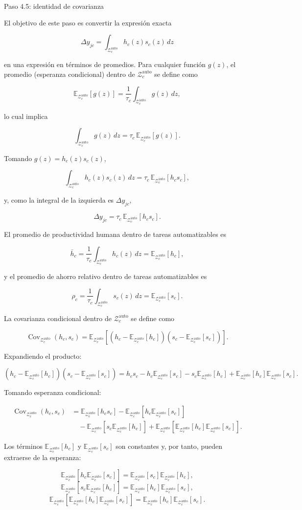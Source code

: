 \documentclass[12pt,a4paper]{article}
\let\textbf\textmd
\newcommand{\Zauto}{\mathcal{Z}^{\mathrm{auto}}_c}
\newcommand{\Eauto}{\mathbb{E}_{\Zauto}}
\newcommand{\Covauto}{\operatorname{Cov}_{\Zauto}}
\newcommand{\dd}{\,dz}
\begin{document}
\bigskip
\noindent\textbf{Paso 4.5: identidad de covarianza}

\medskip
\noindent El objetivo de este paso es convertir la expresión exacta

\[
\Delta y_{jc}=\int_{\Zauto}h_c(z)s_c(z)\dd
\]

en una expresión en términos de promedios. Para cualquier función $g(z)$, el promedio (esperanza condicional) dentro de $\Zauto$ se define como

\[
\Eauto[g(z)]
=
\frac{1}{\tau_c}\int_{\Zauto}g(z)\dd,
\]

lo cual implica

\[
\int_{\Zauto}g(z)\dd=\tau_c\,\Eauto[g(z)].
\]

Tomando $g(z)=h_c(z)s_c(z)$,

\[
\int_{\Zauto}h_c(z)s_c(z)\dd
=
\tau_c\,\Eauto[h_c s_c],
\]

y, como la integral de la izquierda es $\Delta y_{jc}$,

\[
\Delta y_{jc}
=
\tau_c\,\Eauto[h_c s_c].
\]

El promedio de productividad humana dentro de tareas automatizables es

\[
\bar h_c
=
\frac{1}{\tau_c}\int_{\Zauto}h_c(z)\dd
=
\Eauto[h_c],
\]

y el promedio de ahorro relativo dentro de tareas automatizables es

\[
\rho_c
=
\frac{1}{\tau_c}\int_{\Zauto}s_c(z)\dd
=
\Eauto[s_c].
\]

La covarianza condicional dentro de $\Zauto$ se define como

\[
\Covauto(h_c,s_c)
=
\Eauto\left[
\left(h_c-\Eauto[h_c]\right)
\left(s_c-\Eauto[s_c]\right)
\right].
\]

Expandiendo el producto:

\[
\left(h_c-\Eauto[h_c]\right)
\left(s_c-\Eauto[s_c]\right)
=
h_c s_c
-h_c\Eauto[s_c]
-s_c\Eauto[h_c]
+\Eauto[h_c]\Eauto[s_c].
\]

Tomando esperanza condicional:

\begin{align*}
\Covauto(h_c,s_c)
&=
\Eauto[h_c s_c]
-\Eauto[h_c\Eauto[s_c]]\\
&\quad
-\Eauto[s_c\Eauto[h_c]]
+\Eauto[\Eauto[h_c]\Eauto[s_c]].
\end{align*}

Los términos $\Eauto[h_c]$ y $\Eauto[s_c]$ son constantes y, por tanto, pueden extraerse de la esperanza:

\[
\Eauto[h_c\Eauto[s_c]]
=
\Eauto[s_c]\Eauto[h_c],
\]
\[
\Eauto[s_c\Eauto[h_c]]
=
\Eauto[h_c]\Eauto[s_c],
\]
\[
\Eauto[\Eauto[h_c]\Eauto[s_c]]
=
\Eauto[h_c]\Eauto[s_c].
\]
\end{document}
